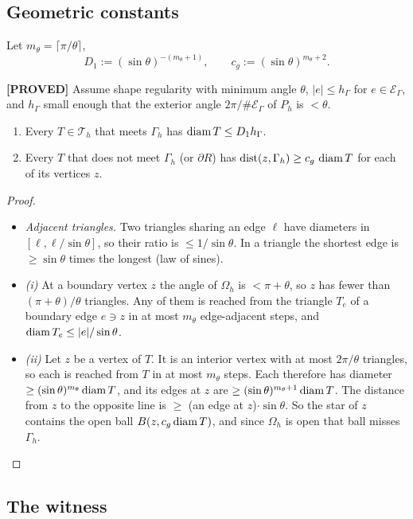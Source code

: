 \documentclass[11pt]{article}
\theoremstyle{remark}\newtheorem{remark}[theorem]{Remark}
\newcommand{\Oh}{\Omega_h}\newcommand{\Gh}{\Gamma_h}\newcommand{\hG}{h_\Gamma}\newcommand{\dn}{\partial_n}
\DeclareMathOperator{\dist}{dist}
\newcommand{\lab}[1]{\textbf{[#1]}}
\newcommand{\Th}{\mathcal T_h}\newcommand{\Zh}{Z_h}\newcommand{\VR}{V_h^R}\newcommand{\EG}{\mathcal E_\Gamma}
\begin{document}
\subsection{Geometric constants}
Let $m_\theta=\lceil\pi/\theta\rceil$,
\[D_1:=(\sin\theta)^{-(m_\theta+1)},\qquad c_g:=(\sin\theta)^{m_\theta+2}.\]
\begin{lemma}\label{lem:growth}\lab{PROVED}
Assume shape regularity with minimum angle $\theta$, $|e|\le\hG$ for $e\in\EG$, and $\hG$ small enough that the exterior angle
$2\pi/\#\EG$ of $P_h$ is $<\theta$.
\begin{enumerate}[label=(\roman*)]
\item Every $T\in\Th$ that meets $\Gh$ has $\diam T\le D_1\hG$.
\item Every $T$ that does not meet $\Gh$ (or $\partial R$) has $\dist(z,\Gh)\ge c_g\,\diam T$ for each of its vertices $z$.
\end{enumerate}
\end{lemma}
\begin{proof}
\begin{itemize}
\item \emph{Adjacent triangles.} Two triangles sharing an edge $\ell$ have diameters in $[\ell,\ell/\sin\theta]$, so their
  ratio is $\le1/\sin\theta$. In a triangle the shortest edge is $\ge\sin\theta$ times the longest (law of sines).
\item \emph{(i)} At a boundary vertex $z$ the angle of $\Oh$ is $<\pi+\theta$, so $z$ has fewer than $(\pi+\theta)/\theta$
  triangles. Any of them is reached from the triangle $T_e$ of a boundary edge $e\ni z$ in at most $m_\theta$ edge-adjacent
  steps, and $\operatorname{diam} T_e\le|e|/\sin\theta$.
\item \emph{(ii)} Let $z$ be a vertex of $T$. It is an interior vertex with at most $2\pi/\theta$ triangles, so each is
  reached from $T$ in at most $m_\theta$ steps. Each therefore has diameter $\ge(\sin\theta)^{m_\theta}\operatorname{diam} T$, and its
  edges at $z$ are $\ge(\sin\theta)^{m_\theta+1}\operatorname{diam} T$. The distance from $z$ to the opposite line is $\ge$ (an edge at
  $z$)$\cdot\sin\theta$. So the star of $z$ contains the open ball $B(z,c_g\operatorname{diam} T)$, and since $\Oh$ is open that ball
  misses $\Gh$.\qedhere
\end{itemize}
\end{proof}

\subsection{The witness}
\end{document}
